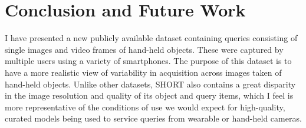 


\section{Conclusion and Future Work} \label{sec:conclusions}

I have presented a new publicly available  dataset containing queries consisting of single images and video frames of hand-held objects.  These were captured by multiple users using a variety of smartphones. The purpose of this dataset is to have a more realistic view of variability in acquisition across images taken of hand-held objects. Unlike other datasets, SHORT also contains a great disparity in the image resolution and quality of its object and query items, which I feel is more representative of the conditions of use we would expect for high-quality, curated models being used to service queries from wearable or hand-held cameras.

